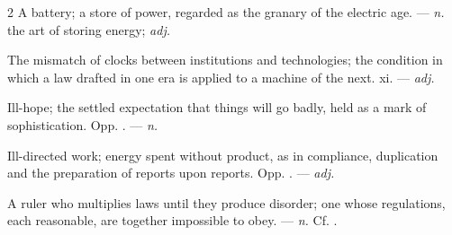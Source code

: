 \begin{multicols}{2}
 A battery; a store of power, regarded as the granary of the electric age.  —  \textit{n.} the art of storing energy;  \textit{adj.}

 The mismatch of clocks between institutions and technologies; the condition in which a law drafted in one era is applied to a machine of the next.   xi. —  \textit{adj.}

 Ill-hope; the settled expectation that things will go badly, held as a mark of sophistication. Opp. . —  \textit{n.}

 Ill-directed work; energy spent without product, as in compliance, duplication and the preparation of reports upon reports. Opp. . —  \textit{adj.}

 A ruler who multiplies laws until they produce disorder; one whose regulations, each reasonable, are together impossible to obey. —  \textit{n.} Cf. .

\end{multicols}

